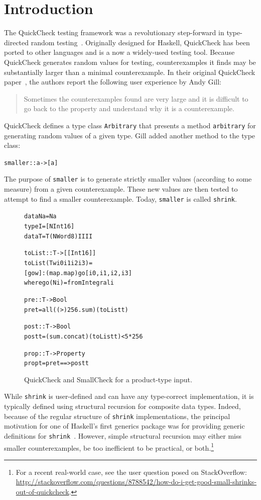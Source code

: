 \documentclass[10pt]{sigplanconf}
\newenvironment{code}{\begin{alltt}\small}{\end{alltt}}
\newcommand{\ttp}[1]{\texttt{#1}}
\begin{document}
\section{Introduction}\label{sec:intro}
The QuickCheck testing framework was a revolutionary step-forward in
type-directed random testing~\cite{qc}.  Originally designed for Haskell,
QuickCheck has been ported to other languages and is a now a widely-used testing
tool.  Because QuickCheck generates random values for testing, counterexamples
it finds may be substantially larger than a minimal counterexample.  In their
original QuickCheck paper~\cite{qc}, the authors report the following user
experience by Andy Gill:
%
\begin{quote}
Sometimes the counterexamples found are very large and it is difficult to go
back to the property and understand why it is a counterexample.
\end{quote}
%
\noindent
QuickCheck defines a type class \ttp{Arbitrary} that presents a method
\ttp{arbitrary} for generating random values of a given type.  Gill added another
method to the type class:
%
\begin{code}
smaller :: a -> [a]
\end{code}
%
\noindent
The purpose of \ttp{smaller} is to generate strictly smaller values (according
to some measure) from a given counterexample.  These new values are then tested
to attempt to find a smaller counterexample.  Today, \ttp{smaller} is called
\ttp{shrink}.

\begin{figure}[ht]
\begin{code}
data N a = N a
type I   = [N Int16]
data T   = T (N Word8) I I I I

toList :: T -> [[Int16]]
toList (T w i0 i1 i2 i3) =
  [go w] : (map . map) go [i0, i1, i2, i3]
  where go (N i) = fromIntegral i

pre :: T -> Bool
pre t = all ((>) 256 . sum) (toList t)

post :: T -> Bool
post t = (sum . concat) (toList t) < 5 * 256

prop :: T -> Property
prop t = pre t ==> post t
\end{code}
  \caption{QuickCheck and SmallCheck for a product-type input.}
  \label{fig:initial}
\end{figure}

While \ttp{shrink} is user-defined and can have any type-correct implementation,
it is typically defined using structural recursion for composite data types.
Indeed, because of the regular structure of \ttp{shrink} implementations, the
principal motivation for one of Haskell's first generics package was for
providing generic definitions for \ttp{shrink}~\cite{syb}.  However, simple
structural recursion may either miss smaller counterexamples, be too inefficient
to be practical, or both.\footnote{For a recent real-world case, see the user
  question posed on StackOverflow:
  \url{http://stackoverflow.com/questions/8788542/how-do-i-get-good-small-shrinks-out-of-quickcheck}.}
\end{document}
